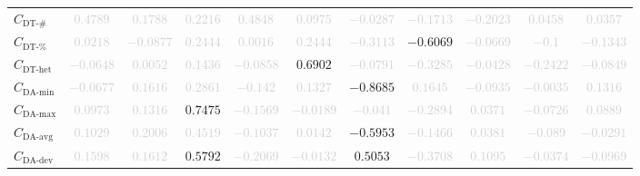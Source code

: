 \documentclass{standalone}
\newcommand{\numberuniquetracesname}{\text{DT-\#}}
\newcommand{\numberuniquetraces}{C_{\numberuniquetracesname}}
\newcommand{\percentageuniquetracesname}{\text{DT-\%}}
\newcommand{\percentageuniquetraces}{C_{\percentageuniquetracesname}}
\newcommand{\dthetname}{\text{DT-het}}
\newcommand{\dthet}{C_{\dthetname}}
\newcommand{\daminname}{\text{DA-min}}
\newcommand{\damin}{C_{\daminname}}
\newcommand{\daavgname}{\text{DA-avg}}
\newcommand{\daavg}{C_{\daavgname}}
\newcommand{\damaxname}{\text{DA-max}}
\newcommand{\damax}{C_{\damaxname}}
\newcommand{\dadevname}{\text{DA-dev}}
\newcommand{\dadev}{C_{\dadevname}}
\begin{document}
\begin{tabular}{lcccccccccc}
$\numberuniquetraces$ & \textcolor{lightgray}{$0.4789$} & \textcolor{lightgray}{$0.1788$} & \textcolor{lightgray}{$0.2216$} & \textcolor{lightgray}{$0.4848$} & \textcolor{lightgray}{$0.0975$} & \textcolor{lightgray}{$-0.0287$} & \textcolor{lightgray}{$-0.1713$} & \textcolor{lightgray}{$-0.2023$} & \textcolor{lightgray}{$0.0458$} & \textcolor{lightgray}{$0.0357$} \\ 
$\percentageuniquetraces$ & \textcolor{lightgray}{$0.0218$} & \textcolor{lightgray}{$-0.0877$} & \textcolor{lightgray}{$0.2444$} & \textcolor{lightgray}{$0.0016$} & \textcolor{lightgray}{$0.2444$} & \textcolor{lightgray}{$-0.3113$} & $-0.6069$ & \textcolor{lightgray}{$-0.0669$} & \textcolor{lightgray}{$-0.1$} & \textcolor{lightgray}{$-0.1343$} \\ 
$\dthet$ & \textcolor{lightgray}{$-0.0648$} & \textcolor{lightgray}{$0.0052$} & \textcolor{lightgray}{$0.1436$} & \textcolor{lightgray}{$-0.0858$} & $0.6902$ & \textcolor{lightgray}{$-0.0791$} & \textcolor{lightgray}{$-0.3285$} & \textcolor{lightgray}{$-0.0428$} & \textcolor{lightgray}{$-0.2422$} & \textcolor{lightgray}{$-0.0849$} \\ 
$\damin$ & \textcolor{lightgray}{$-0.0677$} & \textcolor{lightgray}{$0.1616$} & \textcolor{lightgray}{$0.2861$} & \textcolor{lightgray}{$-0.142$} & \textcolor{lightgray}{$0.1327$} & $-0.8685$ & \textcolor{lightgray}{$0.1645$} & \textcolor{lightgray}{$-0.0935$} & \textcolor{lightgray}{$-0.0035$} & \textcolor{lightgray}{$0.1316$} \\ 
$\damax$ & \textcolor{lightgray}{$0.0973$} & \textcolor{lightgray}{$0.1316$} & $0.7475$ & \textcolor{lightgray}{$-0.1569$} & \textcolor{lightgray}{$-0.0189$} & \textcolor{lightgray}{$-0.041$} & \textcolor{lightgray}{$-0.2894$} & \textcolor{lightgray}{$0.0371$} & \textcolor{lightgray}{$-0.0726$} & \textcolor{lightgray}{$0.0889$} \\ 
$\daavg$ & \textcolor{lightgray}{$0.1029$} & \textcolor{lightgray}{$0.2006$} & \textcolor{lightgray}{$0.4519$} & \textcolor{lightgray}{$-0.1037$} & \textcolor{lightgray}{$0.0142$} & $-0.5953$ & \textcolor{lightgray}{$-0.1466$} & \textcolor{lightgray}{$0.0381$} & \textcolor{lightgray}{$-0.089$} & \textcolor{lightgray}{$-0.0291$} \\ 
$\dadev$ & \textcolor{lightgray}{$0.1598$} & \textcolor{lightgray}{$0.1612$} & $0.5792$ & \textcolor{lightgray}{$-0.2069$} & \textcolor{lightgray}{$-0.0132$} & $0.5053$ & \textcolor{lightgray}{$-0.3708$} & \textcolor{lightgray}{$0.1095$} & \textcolor{lightgray}{$-0.0374$} & \textcolor{lightgray}{$-0.0969$} \\ 

\end{tabular}
\end{document}
